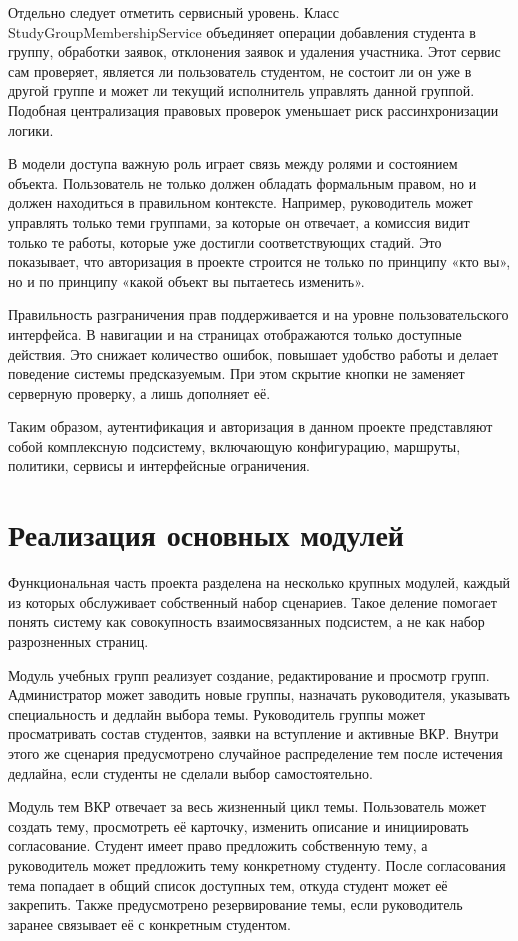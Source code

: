 \documentclass[14pt,a4paper]{extreport}
\begin{document}
Отдельно следует отметить сервисный уровень.
Класс StudyGroupMembershipService объединяет операции добавления студента в
группу, обработки заявок, отклонения заявок и удаления участника.
Этот сервис сам проверяет, является ли пользователь студентом, не состоит
ли он уже в другой группе и может ли текущий исполнитель управлять данной
группой.
Подобная централизация правовых проверок уменьшает риск рассинхронизации
логики.

В модели доступа важную роль играет связь между ролями и состоянием объекта.
Пользователь не только должен обладать формальным правом, но и должен
находиться в правильном контексте.
Например, руководитель может управлять только теми группами, за которые он
отвечает, а комиссия видит только те работы, которые уже достигли
соответствующих стадий.
Это показывает, что авторизация в проекте строится не только по принципу
«кто вы», но и по принципу «какой объект вы пытаетесь изменить».

Правильность разграничения прав поддерживается и на уровне пользовательского
интерфейса.
В навигации и на страницах отображаются только доступные действия.
Это снижает количество ошибок, повышает удобство работы и делает поведение
системы предсказуемым.
При этом скрытие кнопки не заменяет серверную проверку, а лишь дополняет её.

Таким образом, аутентификация и авторизация в данном проекте представляют
собой комплексную подсистему, включающую конфигурацию, маршруты, политики,
сервисы и интерфейсные ограничения.

\section{Реализация основных модулей}

Функциональная часть проекта разделена на несколько крупных модулей, каждый
из которых обслуживает собственный набор сценариев.
Такое деление помогает понять систему как совокупность взаимосвязанных
подсистем, а не как набор разрозненных страниц.

Модуль учебных групп реализует создание, редактирование и просмотр групп.
Администратор может заводить новые группы, назначать руководителя, указывать
специальность и дедлайн выбора темы.
Руководитель группы может просматривать состав студентов, заявки на
вступление и активные ВКР.
Внутри этого же сценария предусмотрено случайное распределение тем после
истечения дедлайна, если студенты не сделали выбор самостоятельно.

Модуль тем ВКР отвечает за весь жизненный цикл темы.
Пользователь может создать тему, просмотреть её карточку, изменить описание
и инициировать согласование.
Студент имеет право предложить собственную тему, а руководитель может
предложить тему конкретному студенту.
После согласования тема попадает в общий список доступных тем, откуда
студент может её закрепить.
Также предусмотрено резервирование темы, если руководитель заранее связывает
её с конкретным студентом.
\end{document}
